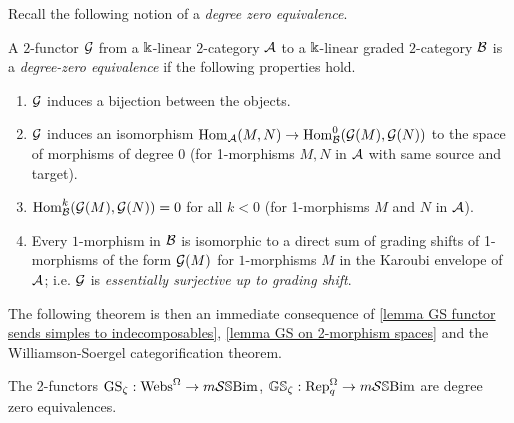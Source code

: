 Recall the following notion of a \emph{degree zero equivalence}.
\begin{definition}\cite[Definition 2.14]{EQuantumI}
    A $2$-functor $\mathcal{G}$ from a $\Bbbk$-linear $2$-category $\mathcal{A}$ to a $\Bbbk$-linear graded $2$-category $\mathcal{B}$ is a \emph{degree-zero equivalence} if the following properties
hold. \begin{enumerate}[label=(\alph*)] 
\item $\mathcal{G}$ induces a bijection between the objects. 
\item $\mathcal{G}$ induces an isomorphism $\operatorname{Hom}_{\mathcal{A}}(M,N) \to \operatorname{Hom}_{\mathcal{B}}^0(\mathcal{G}(M),\mathcal{G}(N))$ to the space of
morphisms of degree $0$ (for 1-morphisms $M, N$ in $\mathcal{A}$ with same source and target). 
\item $\operatorname{Hom}_{\mathcal{B}}^k(\mathcal{G}(M),\mathcal{G}(N))=0$ for all $k<0$ (for 1-morphisms $M$ and $N$ in $\mathcal{A}$). 
\item Every $1$-morphism in $\mathcal{B}$ is isomorphic to a direct sum of grading shifts of 1-morphisms of the form $\mathcal{G}(M)$
for $1$-morphisms $M$ in the Karoubi envelope of $\mathcal{A}$; i.e. $\mathcal{G}$ is \emph{essentially surjective up to grading shift}. \end{enumerate}
\end{definition}

The following theorem is then an immediate consequence of \cref{lemma GS functor sends simples to indecomposables}, \cref{lemma GS  on 2-morphism spaces} and the Williamson-Soergel categorification theorem.

\begin{theorem}\label{thm dQGS functor is a degree zero equivalence}
    The 2-functors $\operatorname{GS}_\zeta: \operatorname{Webs}^{\Omega} \rightarrow m\mathcal{S}\mathbb{S}\text{Bim}$, $\mathbb{GS}_\zeta: \operatorname{Rep}_q^{\Omega} \rightarrow m\mathcal{S}\mathbb{S}\text{Bim}$ are degree zero equivalences.
\end{theorem}

